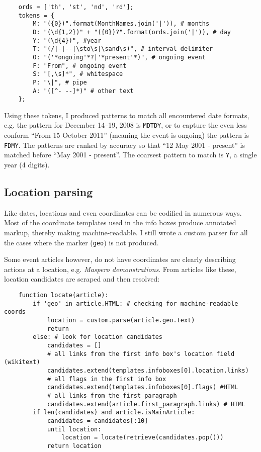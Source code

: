 \begin{lstlisting}
	ords = ['th', 'st', 'nd', 'rd'];
	tokens = {
		M: "({0})".format(MonthNames.join('|')), # months
		D: "(\d{1,2})" + "({0})?".format(ords.join('|')), # day
		Y: "(\d{4})", #year
		T: "(/|-|--|\sto\s|\sand\s)", # interval delimiter
		O: "('*ongoing'*?|'*present'*)", # ongoing event
		F: "From", # ongoing event
		S: "[,\s]*", # whitespace
		P: "\|", # pipe
		A: "([^- --]*)" # other text
	};
\end{lstlisting}

Using these tokens, I produced patterns to match all encountered date formats, e.g. the pattern for December 14--19, 2008 is \verb"MDTDY", or to capture the even less conform ``From 15 October 2011'' (meaning the event is ongoing) the pattern is \verb"FDMY".
The patterns are ranked by accuracy so that ``12 May 2001 - present'' is matched before ``May 2001 - present''.
The coarsest pattern to match is \verb"Y", a single year (4 digits).

\subsection{Location parsing}

Like dates, locations and even coordinates can be codified in numerous ways. 
Most of the coordinate templates used in the info boxes produce annotated markup, thereby making machine-readable.
I still wrote a custom parser for all the cases where the marker (\verb"geo") is not produced.

Some event articles however, do not have coordinates are clearly describing actions at a location, e.g. \emph{Maspero demonstrations}.
From articles like these, location candidates are scraped and then resolved:

\begin{lstlisting}
	function locate(article):
		if 'geo' in article.HTML: # checking for machine-readable coords
			location = custom.parse(article.geo.text)
			return
		else: # look for location candidates
			candidates = []
			# all links from the first info box's location field (wikitext)
			candidates.extend(templates.infoboxes[0].location.links)
			# all flags in the first info box 
			candidates.extend(templates.infoboxes[0].flags) #HTML
			# all links from the first paragraph
			candidates.extend(article.first_paragraph.links) # HTML
		if len(candidates) and article.isMainArticle:
			candidates = candidates[:10]
			until location:
				location = locate(retrieve(candidates.pop()))
			return location
\end{lstlisting}

